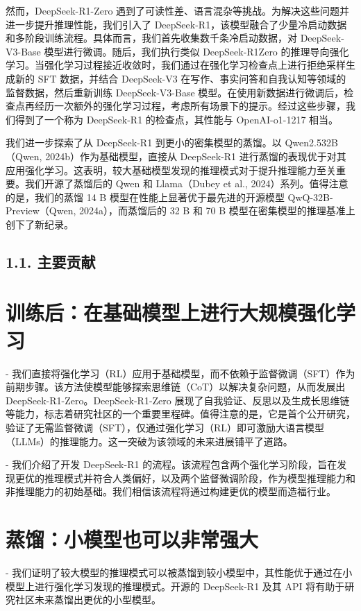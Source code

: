 \documentclass[12pt,a4paper]{report} %
\begin{document}
然而，DeepSeek-R1-Zero 遇到了可读性差、语言混杂等挑战。为解决这些问题并进一步提升推理性能，我们引入了 DeepSeek-R1，该模型融合了少量冷启动数据和多阶段训练流程。具体而言，我们首先收集数千条冷启动数据，对 DeepSeek-V3-Base 模型进行微调。随后，我们执行类似 DeepSeek-R1Zero 的推理导向强化学习。当强化学习过程接近收敛时，我们通过在强化学习检查点上进行拒绝采样生成新的 SFT 数据，并结合 DeepSeek-V3 在写作、事实问答和自我认知等领域的监督数据，然后重新训练 DeepSeek-V3-Base 模型。在使用新数据进行微调后，检查点再经历一次额外的强化学习过程，考虑所有场景下的提示。经过这些步骤，我们得到了一个称为 DeepSeek-R1 的检查点，其性能与 OpenAI-o1-1217 相当。


我们进一步探索了从 DeepSeek-R1 到更小的密集模型的蒸馏。以 Qwen2.532B（Qwen, 2024b）作为基础模型，直接从 DeepSeek-R1 进行蒸馏的表现优于对其应用强化学习。这表明，较大基础模型发现的推理模式对于提升推理能力至关重要。我们开源了蒸馏后的 Qwen 和 Llama（Dubey et al., 2024）系列。值得注意的是，我们的蒸馏 14 B 模型在性能上显著优于最先进的开源模型 QwQ-32B-Preview（Qwen, 2024a），而蒸馏后的 32 B 和 70 B 模型在密集模型的推理基准上创下了新纪录。
\subsection*{1.1. 主要贡献}


\section*{训练后：在基础模型上进行大规模强化学习}


- 我们直接将强化学习（RL）应用于基础模型，而不依赖于监督微调（SFT）作为前期步骤。该方法使模型能够探索思维链（CoT）以解决复杂问题，从而发展出 DeepSeek-R1-Zero。DeepSeek-R1-Zero 展现了自我验证、反思以及生成长思维链等能力，标志着研究社区的一个重要里程碑。值得注意的是，它是首个公开研究，验证了无需监督微调（SFT），仅通过强化学习（RL）即可激励大语言模型（LLMs）的推理能力。这一突破为该领域的未来进展铺平了道路。


- 我们介绍了开发 DeepSeek-R1 的流程。该流程包含两个强化学习阶段，旨在发现更优的推理模式并符合人类偏好，以及两个监督微调阶段，作为模型推理能力和非推理能力的初始基础。我们相信该流程将通过构建更优的模型而造福行业。


\section*{蒸馏：小模型也可以非常强大}


- 我们证明了较大模型的推理模式可以被蒸馏到较小模型中，其性能优于通过在小模型上进行强化学习发现的推理模式。开源的 DeepSeek-R1 及其 API 将有助于研究社区未来蒸馏出更优的小型模型。
\end{document}
